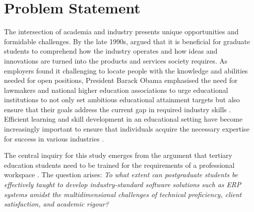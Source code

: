 \section{Problem Statement}
\par{The intersection of academia and industry presents unique opportunities and formidable challenges. By the late 
1990s, \cite{foley1997technology} argued that it is beneficial for graduate students to comprehend how the industry operates 
and how ideas and innovations are turned into the products and services society requires. As employers found it challenging to 
locate people with the knowledge and abilities needed for open positions, President Barack Obama emphasised the need for 
lawmakers and national higher education associations to urge educational institutions to not only set ambitious educational 
attainment targets but also ensure that their goals address the current gap in required industry skills \citep{barnett2011partnering}. 
Efficient learning and skill development in an educational setting have become increasingly important to ensure that 
individuals acquire the necessary expertise for success in various industries \citep{baig2018bridging}. }
\par{The central inquiry for this study emerges from the argument that tertiary education students
need to be trained for the requirements of a professional workspace \citep{baig2018bridging}. The
question arises: \textit{To what extent can postgraduate students be effectively taught to
develop industry-standard software solutions such as ERP systems amidst the multidimensional challenges of 
technical proficiency, client satisfaction, and academic rigour?}}

